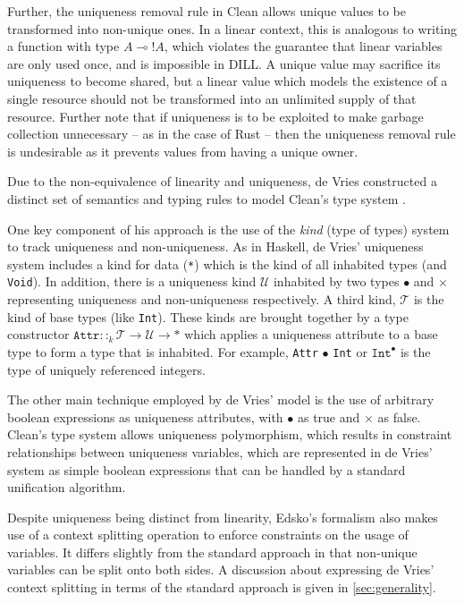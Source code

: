 \documentclass[]{unswthesis}
\newcommand{\lolly}{\multimap}
\let\c\texttt
\let\i\textit
\begin{document}
Further, the uniqueness removal rule in Clean allows unique values to be transformed into non-unique ones. In a linear context, this is analogous to writing a function with type $A \lolly {!A}$, which violates the guarantee that linear variables are only used once, and is impossible in DILL. A unique value may sacrifice its uniqueness to become shared, but a linear value which models the existence of a single resource should not be transformed into an unlimited supply of that resource. Further note that if uniqueness is to be exploited to make garbage collection unnecessary -- as in the case of Rust -- then the uniqueness removal rule is undesirable as it prevents values from having a unique owner.

Due to the non-equivalence of linearity and uniqueness, de Vries constructed a distinct set of semantics and typing rules to model Clean's type system \cite{deVries07}.

One key component of his approach is the use of the \i{kind} (type of types) system to track uniqueness and non-uniqueness. As in Haskell, de Vries' uniqueness system includes a kind for data (\c{*}) which is the kind of all inhabited types (and \c{Void}). In addition, there is a uniqueness kind $\mathcal{U}$ inhabited by two types $\bullet$ and $\times$ representing uniqueness and non-uniqueness respectively. A third kind, $\mathcal{T}$ is the kind of base types (like \c{Int}). These kinds are brought together by a type constructor $\c{Attr} ::_k \mathcal{T} \rightarrow \mathcal{U} \rightarrow *$ which applies a uniqueness attribute to a base type to form a type that is inhabited. For example, \c{Attr} $\bullet$ \c{Int} or $\c{Int}^\bullet$ is the type of uniquely referenced integers.

The other main technique employed by de Vries' model is the use of arbitrary boolean expressions as uniqueness attributes, with $\bullet$ as true and $\times$ as false. Clean's type system allows uniqueness polymorphism, which results in constraint relationships between uniqueness variables, which are represented in de Vries' system as simple boolean expressions that can be handled by a standard unification algorithm.

Despite uniqueness being distinct from linearity, Edsko's formalism also makes use of a context splitting operation to enforce constraints on the usage of variables. It differs slightly from the standard approach in that non-unique variables can be split onto both sides. A discussion about expressing de Vries' context splitting in terms of the standard approach is given in \cref{sec:generality}.
\end{document}
